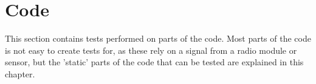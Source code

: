 \section{Code}
This section contains tests performed on parts of the code. Most parts of the code is not easy to create tests for, as these rely on a signal from a radio module or sensor, but the 'static' parts of the code that can be tested are explained in this chapter.

